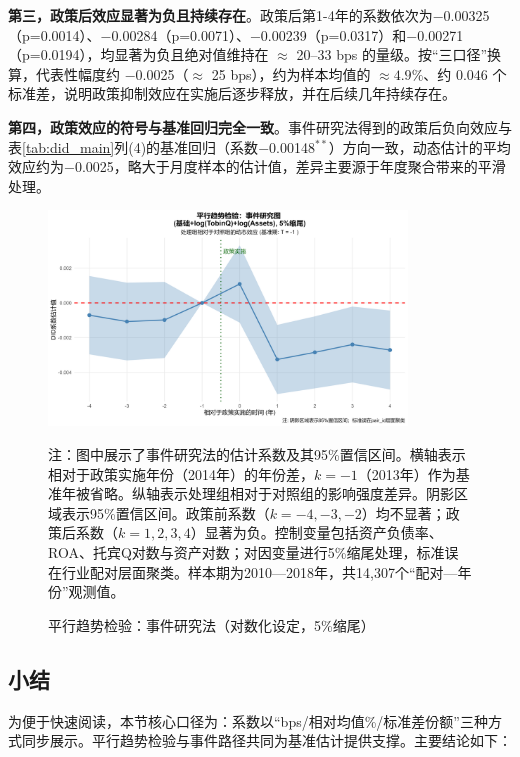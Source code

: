 \textbf{第三，政策后效应显著为负且持续存在}。政策后第1-4年的系数依次为$-$0.00325（p=0.0014）、$-$0.00284（p=0.0071）、$-$0.00239（p=0.0317）和$-$0.00271（p=0.0194），均显著为负且绝对值维持在 $\approx$ 20–33 bps 的量级。按“三口径”换算，代表性幅度约 $-$0.0025（$\approx$ 25 bps），约为样本均值的 $\approx4.9\%$、约 $0.046$ 个标准差，说明政策抑制效应在实施后逐步释放，并在后续几年持续存在。

\textbf{第四，政策效应的符号与基准回归完全一致}。事件研究法得到的政策后负向效应与表\ref{tab:did_main}列(4)的基准回归（系数$-$0.00148$^{**}$）方向一致，动态估计的平均效应约为$-$0.0025，略大于月度样本的估计值，差异主要源于年度聚合带来的平滑处理。

\begin{figure}[htbp]
\centering
\includegraphics[width=0.85\textwidth]{figures/PT_logQA_0pct5.png}
\caption{平行趋势检验：事件研究法（对数化设定，5\%缩尾）}
\label{fig:parallel_trends}
\begin{minipage}{0.9\textwidth}
\footnotesize
注：图中展示了事件研究法的估计系数及其95\%置信区间。横轴表示相对于政策实施年份（2014年）的年份差，$k=-1$（2013年）作为基准年被省略。纵轴表示处理组相对于对照组的影响强度差异。阴影区域表示95\%置信区间。政策前系数（$k=-4,-3,-2$）均不显著；政策后系数（$k=1,2,3,4$）显著为负。控制变量包括资产负债率、ROA、托宾Q对数与资产对数；对因变量进行5\%缩尾处理，标准误在行业配对层面聚类。样本期为2010—2018年，共14,307个“配对—年份”观测值。
\end{minipage}
\end{figure}

\subsection{小结}

为便于快速阅读，本节核心口径为：系数以“bps/相对均值\%/标准差份额”三种方式同步展示。平行趋势检验与事件路径共同为基准估计提供支撑。主要结论如下：

